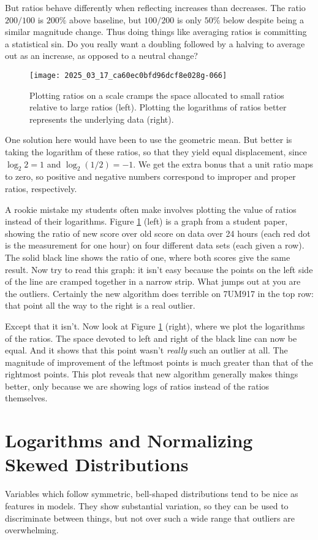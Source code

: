 \documentclass[10pt]{article}
\begin{document}
But ratios behave differently when reflecting increases than decreases. The ratio $200/100$ is $200\%$ above baseline, but $100/200$ is only $50\%$ below despite being a similar magnitude change. Thus doing things like averaging ratios is committing a statistical sin. Do you really want a doubling followed by a halving to average out as an increase, as opposed to a neutral change?

\begin{figure}[h]
    \centering
    \texttt{[image: 2025\_03\_17\_ca60ec0bfd96dcf8e028g-066]}
    \caption{Plotting ratios on a scale cramps the space allocated to small ratios relative to large ratios (left). Plotting the logarithms of ratios better represents the underlying data (right).}
    \label{figure:ratios}
\end{figure}

One solution here would have been to use the geometric mean. But better is taking the logarithm of these ratios, so that they yield equal displacement, since $\log_2 2 = 1$ and $\log_2(1/2) = -1$. We get the extra bonus that a unit ratio maps to zero, so positive and negative numbers correspond to improper and proper ratios, respectively.

A rookie mistake my students often make involves plotting the value of ratios instead of their logarithms. Figure \ref{figure:ratios} (left) is a graph from a student paper, showing the ratio of new score over old score on data over 24 hours (each red dot is the measurement for one hour) on four different data sets (each given a row). The solid black line shows the ratio of one, where both scores give the same result. Now try to read this graph: it isn’t easy because the points on the left side of the line are cramped together in a narrow strip. What jumps out at you are the outliers. Certainly the new algorithm does terrible on 7UM917 in the top row: that point all the way to the right is a real outlier.

Except that it isn’t. Now look at Figure \ref{figure:ratios} (right), where we plot the logarithms of the ratios. The space devoted to left and right of the black line can now be equal. And it shows that this point wasn’t \textit{really} such an outlier at all. The magnitude of improvement of the leftmost points is much greater than that of the rightmost points. This plot reveals that new algorithm generally makes things better, only because we are showing logs of ratios instead of the ratios themselves.

\section{Logarithms and Normalizing Skewed Distributions}
Variables which follow symmetric, bell-shaped distributions tend to be nice as features in models. They show substantial variation, so they can be used to discriminate between things, but not over such a wide range that outliers are overwhelming.
\end{document}
